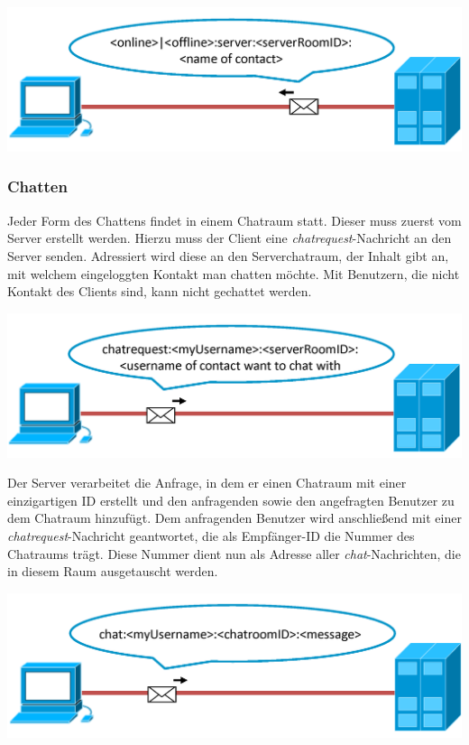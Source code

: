 \documentclass[12pt,a4paper,bibliography=totocnumbered,listof=totocnumbered]{scrartcl}
\begin{document}
\vspace{1em}
\begin{minipage}{\linewidth}
	\centering
	\includegraphics[width=0.7\linewidth]{img/status1.png}
	\label{fig:status1}
\end{minipage}

\subsubsection{Chatten}
Jeder Form des Chattens findet in einem Chatraum statt. Dieser muss zuerst vom Server erstellt werden. Hierzu muss der Client eine \textit{chatrequest}-Nachricht an den Server senden. Adressiert wird diese an den Serverchatraum, der Inhalt gibt an, mit welchem eingeloggten Kontakt man chatten möchte. Mit Benutzern, die nicht Kontakt des Clients sind, kann nicht gechattet werden.

\vspace{1em}
\begin{minipage}{\linewidth}
	\centering
	\includegraphics[width=0.7\linewidth]{img/chatrequest1.png}
	\label{fig:chatrequest1}
\end{minipage}
\vspace{0.5em}

Der Server verarbeitet die Anfrage, in dem er einen Chatraum mit einer einzigartigen ID erstellt und den anfragenden sowie den angefragten Benutzer zu dem Chatraum hinzufügt. Dem anfragenden Benutzer wird anschließend mit einer \textit{chatrequest}-Nachricht geantwortet, die als Empfänger-ID die Nummer des Chatraums trägt. Diese Nummer dient nun als Adresse aller \textit{chat}-Nachrichten, die in diesem Raum ausgetauscht werden. 

\vspace{1em}
\begin{minipage}{\linewidth}
	\centering
	\includegraphics[width=0.7\linewidth]{img/chat1.png}
	\label{fig:chat1}
\end{minipage}
\vspace{0.5em}
\end{document}
